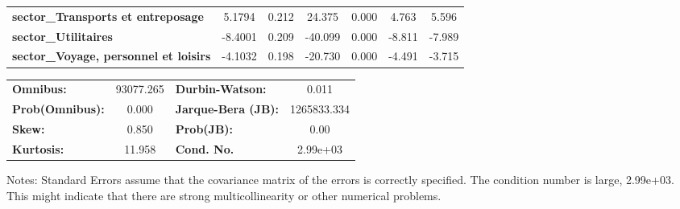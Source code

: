\begin{center}
\begin{tabular}{lcccccc}
\textbf{sector\_Transports et entreposage}                            &       5.1794  &        0.212     &    24.375  &         0.000        &        4.763    &        5.596     \\
\textbf{sector\_Utilitaires}                                          &      -8.4001  &        0.209     &   -40.099  &         0.000        &       -8.811    &       -7.989     \\
\textbf{sector\_Voyage, personnel et loisirs}                         &      -4.1032  &        0.198     &   -20.730  &         0.000        &       -4.491    &       -3.715     \\
\bottomrule
\end{tabular}
\begin{tabular}{lclc}
\textbf{Omnibus:}       & 93077.265 & \textbf{  Durbin-Watson:     } &      0.011   \\
\textbf{Prob(Omnibus):} &    0.000  & \textbf{  Jarque-Bera (JB):  } & 1265833.334  \\
\textbf{Skew:}          &    0.850  & \textbf{  Prob(JB):          } &       0.00   \\
\textbf{Kurtosis:}      &   11.958  & \textbf{  Cond. No.          } &   2.99e+03   \\
\bottomrule
\end{tabular}
\end{center}

Notes: \newline
 [1] Standard Errors assume that the covariance matrix of the errors is correctly specified. \newline
 [2] The condition number is large, 2.99e+03. This might indicate that there are \newline
 strong multicollinearity or other numerical problems.